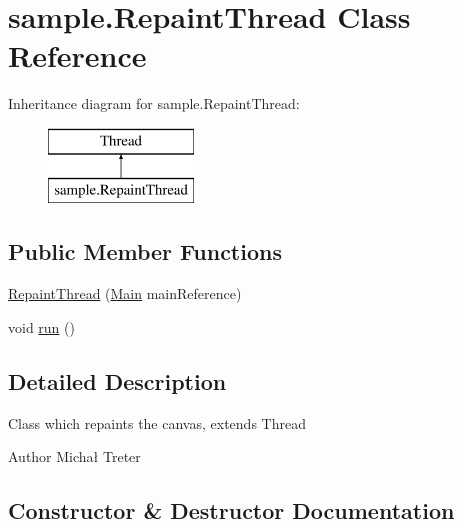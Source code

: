 \hypertarget{classsample_1_1_repaint_thread}{}\section{sample.\+Repaint\+Thread Class Reference}
\label{classsample_1_1_repaint_thread}
Inheritance diagram for sample.\+Repaint\+Thread\+:\begin{figure}[H]
\begin{center}
\leavevmode
\includegraphics[height=2.000000cm]{classsample_1_1_repaint_thread}
\end{center}
\end{figure}
\subsection*{Public Member Functions}
\begin{DoxyCompactItemize}
\item 
\hyperlink{classsample_1_1_repaint_thread_aae17428a94ac6b22a062d2fa67ff1433}{Repaint\+Thread} (\hyperlink{classsample_1_1_main}{Main} main\+Reference)
\item 
void \hyperlink{classsample_1_1_repaint_thread_a607b591ec74e64a921015457fd9c66ab}{run} ()
\end{DoxyCompactItemize}


\subsection{Detailed Description}
Class which repaints the canvas, extends Thread \begin{DoxyAuthor}{Author}
Michał Treter 
\end{DoxyAuthor}


\subsection{Constructor \& Destructor Documentation}
\mbox{\label{classsample_1_1_repaint_thread_aae17428a94ac6b22a062d2fa67ff1433}} 

